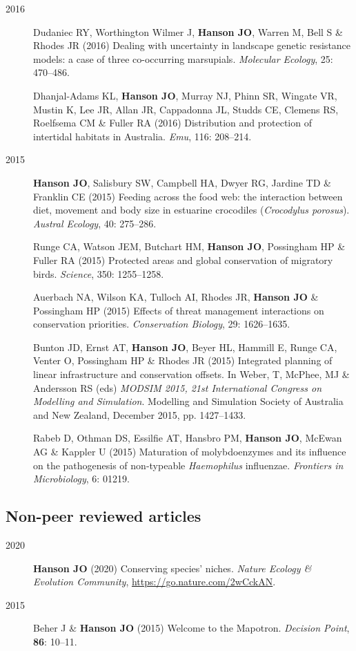 \documentclass[12pt,a4paper]{article}
\begin{document}
\begin{description}
\item[2016] Dudaniec RY, Worthington Wilmer J, \textbf{Hanson JO}, Warren M, Bell S \& Rhodes JR (2016) Dealing with uncertainty in landscape genetic resistance models: a case of three co-occurring marsupials. \textit{Molecular Ecology}, 25: 470--486.

\item[] Dhanjal-Adams KL, \textbf{Hanson JO}, Murray NJ, Phinn SR, Wingate VR, Mustin K, Lee JR, Allan JR, Cappadonna JL, Studds CE, Clemens RS, Roelfsema CM \& Fuller RA (2016) Distribution and protection of intertidal habitats in Australia. \textit{Emu}, 116: 208--214.

\item[2015] \textbf{Hanson JO}, Salisbury SW, Campbell HA, Dwyer RG, Jardine TD \& Franklin CE (2015) Feeding across the food web: the interaction between diet, movement and body size in estuarine crocodiles (\textit{Crocodylus porosus}). \textit{Austral Ecology}, 40: 275--286.

\item[] Runge CA, Watson JEM, Butchart HM, \textbf{Hanson JO}, Possingham HP \& Fuller RA (2015) Protected areas and global conservation of migratory birds. \textit{Science}, 350: 1255--1258.

Auerbach NA, Wilson KA, Tulloch AI, Rhodes JR, \textbf{Hanson JO} \& Possingham HP (2015) Effects of threat management interactions on conservation priorities. \textit{Conservation Biology}, 29: 1626--1635.

\item[] Bunton JD, Ernst AT, \textbf{Hanson JO}, Beyer HL, Hammill E, Runge CA, Venter O, Possingham HP \& Rhodes JR (2015) Integrated planning of linear infrastructure and conservation offsets. In Weber, T, McPhee, MJ \& Andersson RS (eds) \textit{MODSIM 2015, 21st International Congress on Modelling and Simulation}. Modelling and Simulation Society of Australia and New Zealand, December 2015, pp. 1427--1433.

\item[] Rabeb D, Othman DS, Essilfie AT, Hansbro PM, \textbf{Hanson JO}, McEwan AG \& Kappler U (2015) Maturation of molybdoenzymes and its influence on the pathogenesis of non-typeable \textit{Haemophilus} influenzae. \textit{Frontiers in Microbiology}, 6: 01219.

\end{description}

\subsection*{Non-peer reviewed articles}
\begin{description}

\item[2020] \textbf{Hanson JO} (2020) Conserving species' niches. \textit{Nature Ecology \& Evolution Community}, \url{https://go.nature.com/2wCckAN}.

\item[2015] Beher J \& \textbf{Hanson JO} (2015) Welcome to the Mapotron. \textit{Decision Point}, \textbf{86}: 10--11.

\end{description}
\end{document}
